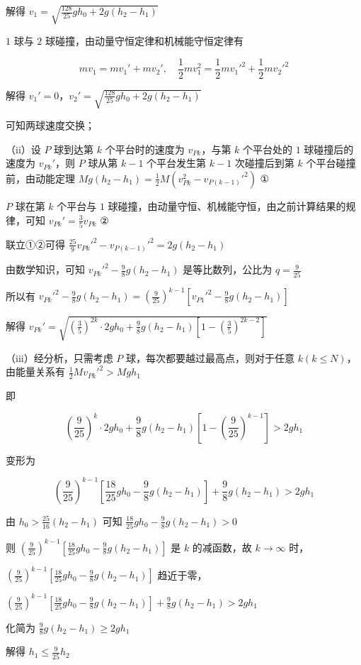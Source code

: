\documentclass[\gkver]{gaokaozhenti}
\begin{document}
\begin{enumerate}
{解得 $ v_{1}=\sqrt{\frac{128}{25}gh_{0}+2g(h_{2}-h_{1})} $

$ 1 $ 球与 $ 2 $ 球碰撞，由动量守恒定律和机械能守恒定律有

\[ mv_{1}=mv_{1}'+mv_{2}',\quad \frac{1}{2}mv_{1}^{2}=\frac{1}{2}mv_{1}'^{2}+\frac{1}{2}mv_{2}'^{2} \]

解得 $ v_{1}'=0 $，$ v_{2}'=\sqrt{\frac{128}{25}gh_{0}+2g(h_{2}-h_{1})} $

可知两球速度交换；

（ii）设 $ P $ 球到达第 $ k $ 个平台时的速度为 $ v_{Pk} $，与第 $ k $ 个平台处的 $ 1 $ 球碰撞后的速度为 $ v_{Pk}' $，则 $ P $ 球从第 $ k-1 $ 个平台发生第 $ k-1 $ 次碰撞后到第 $ k $ 个平台碰撞前，由动能定理 $ Mg\left(h_{2}-h_{1}\right)=\frac{1}{2}M\left(v_{Pk}^{2}-v_{P(k-1)}'^{2}\right) $ ①

$ P $ 球在第 $ k $ 个平台与 $ 1 $ 球碰撞，由动量守恒、机械能守恒，由之前计算结果的规律，可知 $ v_{Pk}' = \frac{3}{5} v_{Pk} $ ②

联立①②可得 $ \frac{25}{9}v_{Pk}'^{2}-v_{P(k-1)}'^{2}=2g\left(h_{2}-h_{1}\right) $

由数学知识，可知 $ v_{Pk}'^{2}-\frac{9}{8}g\left(h_{2}-h_{1}\right) $ 是等比数列，公比为 $ q=\frac{9}{25} $

所以有 $ v_{Pk}'^{2}-\frac{9}{8}g\left(h_{2}-h_{1}\right)=\left(\frac{9}{25}\right)^{k-1}\left[v_{P1}'^{2}-\frac{9}{8}g\left(h_{2}-h_{1}\right)\right] $

解得 $ v_{Pk}' = \sqrt{\left(\frac{3}{5}\right)^{2k} \cdot 2gh_{0} + \frac{9}{8} g(h_{2} - h_{1}) \left[ 1 - \left(\frac{3}{5}\right)^{2k-2} \right]} $

（iii）经分析，只需考虑 $ P $ 球，每次都要越过最高点，则对于任意 $ k (k \leq N) $，由能量关系有 $ \frac{1}{2} M v_{Pk}'^{2} > Mgh_{1} $

即

\[ \left(\frac{9}{25}\right)^{k}\cdot 2gh_{0}+\frac{9}{8}g\left(h_{2}-h_{1}\right)\left[1-\left(\frac{9}{25}\right)^{k-1}\right]>2gh_{1} \]

变形为

\[ \left(\frac{9}{25}\right)^{k-1}\left[\frac{18}{25}gh_{0}-\frac{9}{8}g\left(h_{2}-h_{1}\right)\right]+\frac{9}{8}g\left(h_{2}-h_{1}\right)>2gh_{1} \]

由 $ h_{0} > \frac{25}{16}(h_{2} - h_{1}) $ 可知 $ \frac{18}{25}gh_{0} - \frac{9}{8}g(h_{2} - h_{1}) > 0 $

则 $ \left(\frac{9}{25}\right)^{k-1}\left[\frac{18}{25}gh_{0}-\frac{9}{8}g\left(h_{2}-h_{1}\right)\right] $ 是 $ k $ 的减函数，故 $ k\to\infty $ 时，

$ \left(\frac{9}{25}\right)^{k-1}\left[\frac{18}{25}gh_{0}-\frac{9}{8}g\left(h_{2}-h_{1}\right)\right] $ 趋近于零，

$ \left(\frac{9}{25}\right)^{k-1}\left[\frac{18}{25}gh_{0}-\frac{9}{8}g\left(h_{2}-h_{1}\right)\right]+\frac{9}{8}g\left(h_{2}-h_{1}\right)>2gh_{1} $

化简为 $ \frac{9}{8}g\left(h_{2}-h_{1}\right)\geq 2gh_{1} $

解得 $ h_{1} \leq \frac{9}{25} h_{2} $
}
\end{enumerate}
\end{document}
